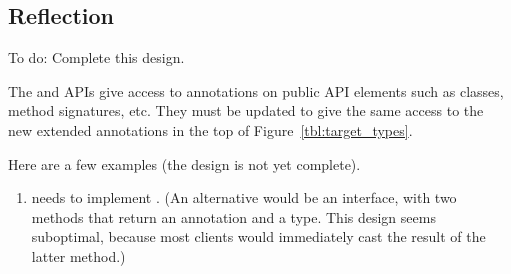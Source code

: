 \documentclass[10pt]{article}
\begin{document}
\subsection{Reflection\label{reflection}}

To do:  Complete this design.

The  and  APIs give access
to annotations on public API elements such as classes,
method signatures, etc.  They must be updated to give the same
access to the new extended annotations in the top of
Figure~\ref{tbl:target_types}.

Here are a few examples (the design is not yet complete).

\begin{enumerate}
\item
{} needs to implement
.
(An alternative would be an 
interface, with two methods that return an annotation and a type.  This
design seems suboptimal, because most
clients would immediately cast the result of the latter method.)

\end{enumerate}

% 
% 
% 
% 
\end{document}
